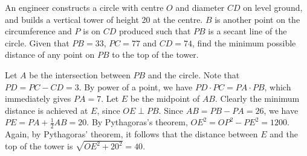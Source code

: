 \begin{question}[40]\label{Q::2024-S-1-16}
    An engineer constructs a circle with centre $O$ and diameter $CD$ on level ground, and builds a vertical tower of height 20 at the centre. $B$ is another point on the circumference and $P$ is on $CD$ produced such that $PB$ is a secant line of the circle. Given that $PB = 33$, $PC = 77$ and $CD = 74$, find the minimum possible distance of any point on $PB$ to the top of the tower.

    \begin{center}
    \end{center}
\end{question}
\begin{center}
\end{center}
\begin{solution*}
    Let $A$ be the intersection between $PB$ and the circle. Note that $PD = PC - CD = 3$. By power of a point, we have $PD \cdot PC = PA \cdot PB$, which immediately gives $PA = 7$. Let $E$ be the midpoint of $AB$. Clearly the minimum distance is achieved at $E$, since $OE \perp PB$. Since $AB = PB - PA = 26$, we have $PE = PA + \frac12 AB = 20$. By Pythagoras's theorem, $OE^2 = OP^2 - PE^2 = 1200$. Again, by Pythagoras' theorem, it follows that the distance between $E$ and the top of the tower is $\sqrt{OE^2 + 20^2} = 40$.
\end{solution*}

